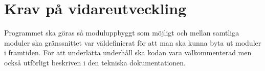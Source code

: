 \section{Krav på vidareutveckling}
Programmet ska göras så moduluppbyggt som möjligt och mellan samtliga moduler ska gränssnittet var väldefinierat för att man ska kunna byta ut moduler i framtiden. För att underlätta underhåll ska kodan vara välkommenterad men också utförligt beskriven i den tekniska dokumentationen. 
\begin{LIPSkravlista}
\end{LIPSkravlista}
